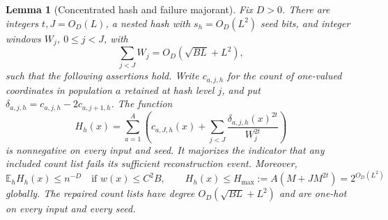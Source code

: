 \documentclass[11pt,letterpaper]{article}
\newtheorem{lemma}[theorem]{Lemma}
\theoremstyle{definition}
\theoremstyle{remark}
\begin{document}
\begin{lemma}[Concentrated hash and failure majorant]\label{filt:majorant}
Fix $D>0$.  There are integers $t,J=O_D(L)$, a nested hash with
$s_h=O_D(L^2)$ seed bits, and integer windows $W_j$, $0\le j<J$, with
\[
 \sum_{j<J} W_j=O_D(\sqrt{BL}+L^2),
\]
such that the following assertions hold.  Write $c_{a,j,h}$ for the
count of one-valued coordinates in population $a$ retained at hash
level $j$, and put $\delta_{a,j,h}=c_{a,j,h}-2c_{a,j+1,h}$.
The function
\begin{equation}\label{filt:H}
 H_h(x)=\sum_{a=1}^{A}\left(
 c_{a,J,h}(x)+
 \sum_{j<J}\frac{\delta_{a,j,h}(x)^{2t}}{W_j^{2t}}
 \right)
\end{equation}
is nonnegative on every input and seed.  It majorizes the indicator
that any included count list fails its sufficient reconstruction event.
Moreover,
\begin{equation}\label{filt:H-bounds}
 \mathbb E_h H_h(x)\le n^{-D}\quad\text{if }w(x)\le C^2B,
 \qquad
 H_h(x)\le H_{\max}:=A(M+JM^{2t})=2^{O_D(L^2)}
\end{equation}
globally.  The repaired count lists have degree
$O_D(\sqrt{BL}+L^2)$ and are one-hot on every input and every seed.
\end{lemma}
\end{document}
